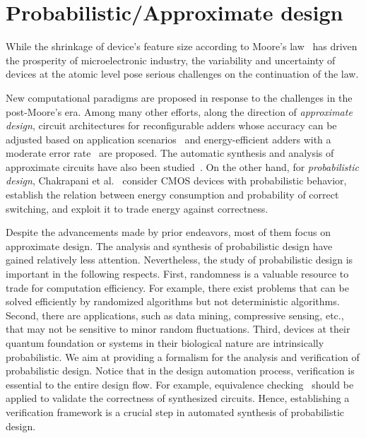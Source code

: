 \section{Probabilistic/Approximate design}
\label{sect:related-work-prob-approx}

While the shrinkage of device's feature size according to Moore's law~\cite{Moore1965}
has driven the prosperity of microelectronic industry,
the variability and uncertainty of devices at the atomic level
pose serious challenges on the continuation of the law.

New computational paradigms are proposed in response to the challenges in the post-Moore's era.
Among many other efforts,
along the direction of \textit{approximate design},
circuit architectures for
reconfigurable adders whose accuracy can be adjusted based on application scenarios~\cite{Kahng2012,Ye2013}
and energy-efficient adders with a moderate error rate~\cite{Kim2013} are proposed.
The automatic synthesis and analysis of approximate circuits have also been studied~\cite{Venkatesan2011ApproxDesign,Venkataramani2012,Miao2013,Miao2014,Li2014,Mrazek2016,Rehman2016}.
On the other hand, for \textit{probabilistic design},
Chakrapani et al.~\cite{Chakrapani2006ProbDesign} consider CMOS devices with probabilistic behavior,
establish the relation between energy consumption and probability of correct switching,
and exploit it to trade energy against correctness.

Despite the advancements made by prior endeavors, most of them focus on approximate design.
The analysis and synthesis of probabilistic design have gained relatively less attention.
Nevertheless, the study of probabilistic design is important in the following respects.
First, randomness is a valuable resource to trade for computation efficiency.
For example, there exist problems that can be solved efficiently by randomized algorithms
but not deterministic algorithms.
Second, there are applications, such as data mining, compressive sensing, etc.,
that may not be sensitive to minor random fluctuations.
Third, devices at their quantum foundation or systems in their biological nature are intrinsically probabilistic.
We aim at providing a formalism for the analysis and verification of probabilistic design.
Notice that in the design automation process,
verification is essential to the entire design flow.
For example, equivalence checking~\cite{Kuehlmann1997,Mishchenko2006}
should be applied to validate the correctness of synthesized circuits.
Hence, establishing a verification framework is a crucial step in automated synthesis of probabilistic design.

